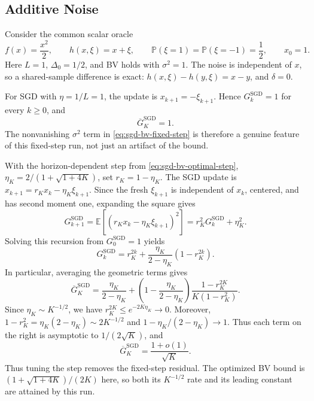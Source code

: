 \subsection{Additive Noise}
\label{subsec:additive-noise-comparison}

Consider the common scalar oracle
\begin{equation}
\label{eq:additive-comparison-oracle}
f(x)=\frac{x^2}{2},\qquad
h(x,\xi)=x+\xi,\qquad
\mathbb P(\xi=1)=\mathbb P(\xi=-1)=\frac12,\qquad x_0=1.
\end{equation}
Here $L=1$, $\Delta_0=1/2$, and BV holds with $\sigma^2=1$.
The noise is independent of $x$, so a shared-sample difference is
exact: $h(x,\xi)-h(y,\xi)=x-y$, and $\delta=0$.

For SGD with $\eta=1/L=1$, the update is
$x_{k+1}=-\xi_{k+1}$. Hence $G_k^{\mathrm{SGD}}=1$ for every
$k\geq0$, and
\begin{equation}
\label{eq:additive-sgd-fixed}
\boxed{\overline G_K^{\mathrm{SGD}}=1.}
\end{equation}
The nonvanishing $\sigma^2$ term in \eqref{eq:sgd-bv-fixed-step}
is therefore a genuine feature of this fixed-step run, not just an
artifact of the bound.

With the horizon-dependent step from \eqref{eq:sgd-bv-optimal-step},
$\eta_K=2/(1+\sqrt{1+4K})$, set $r_K=1-\eta_K$. The SGD update is
$x_{k+1}=r_Kx_k-\eta_K\xi_{k+1}$. Since the fresh
$\xi_{k+1}$ is independent of $x_k$, centered, and has second
moment one, expanding the square gives
\[
G_{k+1}^{\mathrm{SGD}}
=\mathbb E[(r_Kx_k-\eta_K\xi_{k+1})^2]
=r_K^2G_k^{\mathrm{SGD}}+\eta_K^2.
\]
Solving this recursion from $G_0^{\mathrm{SGD}}=1$ yields
\[
G_k^{\mathrm{SGD}}=r_K^{2k}
  +\frac{\eta_K}{2-\eta_K}(1-r_K^{2k}).
\]
In particular, averaging the geometric terms gives
\[
\overline G_K^{\mathrm{SGD}}
=\frac{\eta_K}{2-\eta_K}
 +\left(1-\frac{\eta_K}{2-\eta_K}\right)
  \frac{1-r_K^{2K}}{K(1-r_K^2)}.
\]
Since $\eta_K\sim K^{-1/2}$, we have
$r_K^{2K}\leq e^{-2K\eta_K}\to0$. Moreover,
$1-r_K^2=\eta_K(2-\eta_K)\sim2K^{-1/2}$ and
$1-\eta_K/(2-\eta_K)\to1$. Thus each term on the right is
asymptotic to $1/(2\sqrt K)$, and
\begin{equation}
\label{eq:additive-sgd-tuned}
\boxed{\overline G_K^{\mathrm{SGD}}
=\frac{1+o(1)}{\sqrt K}.}
\end{equation}
Thus tuning the step removes the fixed-step residual. The optimized
BV bound is $(1+\sqrt{1+4K})/(2K)$ here, so both its $K^{-1/2}$
rate and its leading constant are attained by this run.

